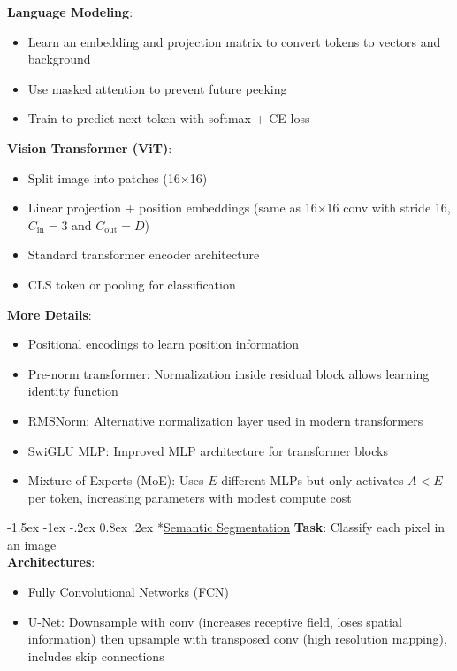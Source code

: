 \documentclass{article}
\makeatletter
\renewcommand\section{\@startsection{section}{1}{\z@}%
                                  {-1.5ex \@plus -1ex \@minus -.2ex}%
                                  {0.8ex \@plus.2ex}%
                                  {\normalfont\small\bfseries}}
\makeatother
\begin{document}
\begin{multicols}{3}
\textbf{Language Modeling}:
\begin{itemize}
\item Learn an embedding and projection matrix to convert tokens to vectors and background
\item Use masked attention to prevent future peeking
\item Train to predict next token with softmax + CE loss
\end{itemize}

\textbf{Vision Transformer (ViT)}:
\begin{itemize}
\item Split image into patches (16×16)
\item Linear projection + position embeddings (same as 16×16 conv with stride 16, $C_{\text{in}} = 3$ and $C_{\text{out}} = D$)
\item Standard transformer encoder architecture
\item CLS token or pooling for classification
\end{itemize}

\textbf{More Details}:
\begin{itemize}
\item Positional encodings to learn position information
\item Pre-norm transformer: Normalization inside residual block allows learning identity function
\item RMSNorm: Alternative normalization layer used in modern transformers
\item SwiGLU MLP: Improved MLP architecture for transformer blocks
\item Mixture of Experts (MoE): Uses $E$ different MLPs but only activates $A < E$ per token, increasing parameters with modest compute cost
\end{itemize}

\section*{\underline{Semantic Segmentation}}
\textbf{Task}: Classify each pixel in an image\\
\textbf{Architectures}:
\begin{itemize}
\item Fully Convolutional Networks (FCN)
\item U-Net: Downsample with conv (increases receptive field, loses spatial information) then upsample with transposed conv (high resolution mapping), includes skip connections
\end{itemize}


\end{multicols}
\end{document}

